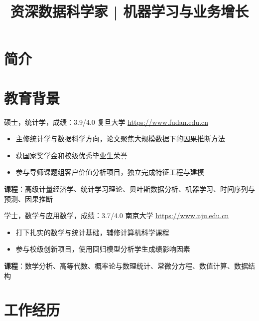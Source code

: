 \documentclass[a4paper, serif, 10pt]{moderncv}
\title{资深数据科学家 | 机器学习与业务增长}
\begin{document}
\maketitle

\section{简介}

\section{教育背景}

        {硕士，统计学，成绩：3.9/4.0}
        {复旦大学}
        {\url{https://www.fudan.edu.cn}}
        {}
        {\begin{itemize}
\item 主修统计学与数据科学方向，论文聚焦大规模数据下的因果推断方法
\item 获国家奖学金和校级优秀毕业生荣誉
\item 参与导师课题组客户价值分析项目，独立完成特征工程与建模
\end{itemize}
\textbf{课程}：高级计量经济学、统计学习理论、贝叶斯数据分析、机器学习、时间序列与预测、因果推断}

        {学士，数学与应用数学，成绩：3.7/4.0}
        {南京大学}
        {\url{https://www.nju.edu.cn}}
        {}
        {\begin{itemize}
\item 打下扎实的数学与统计基础，辅修计算机科学课程
\item 参与校级创新项目，使用回归模型分析学生成绩影响因素
\end{itemize}
\textbf{课程}：数学分析、高等代数、概率论与数理统计、常微分方程、数值计算、数据结构}
\section{工作经历}
\end{document}

